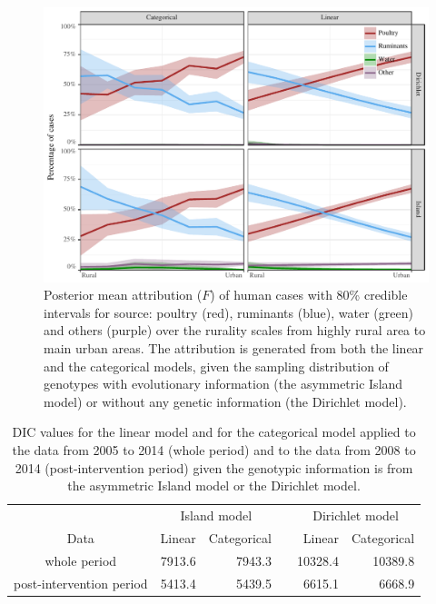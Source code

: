 \documentclass[AMA,STIX1COL]{WileyNJD-v2}
\begin{document}
\begin{figure}
\centering
\includegraphics[width=.9\linewidth]{figures/fig_attribution.pdf}
\caption{Posterior mean attribution ($F$) of human cases with 80\% credible intervals for source: poultry (red), ruminants (blue), water (green) and others (purple) over the rurality scales from highly rural area to main urban areas. The attribution is generated from both the linear and the categorical models, given the sampling distribution of genotypes with evolutionary information (the asymmetric Island model) or without any genetic information (the Dirichlet model).}
\label{fig:attribution}
\end{figure}

\begin{table}
  \begin{center}
    \begin{tabular}{crrrrr}
      \toprule
      & \multicolumn{2}{c}{Island model}  & \multicolumn{1}{c}{} & \multicolumn{2}{c}{Dirichlet model} \\
      Data & Linear & Categorical & & Linear & Categorical\\ \midrule
      whole period  & 7913.6 & 7943.3  & & 10328.4  & 10389.8 \\
      post-intervention period  & 5413.4  & 5439.5  & & 6615.1   & 6668.9 \\
      \bottomrule
    \end{tabular}
  \end{center}
  \caption{DIC values for the linear model and for the categorical model applied to the data from 2005 to 2014 (whole period) and to the data from 2008 to 2014 (post-intervention period) given the genotypic information is from the asymmetric Island model or the Dirichlet model.}
  \label{tab:dic}
\end{table}
\end{document}
